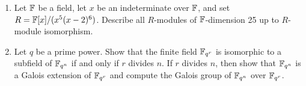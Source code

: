 \begin{enumerate}
\vspace{0.2in}

\item Let $ {\Bbb F} $ be a field, let $x$ be an indeterminate over ${\Bbb F}$,
and set $ R={\Bbb F}[x]/(x^5(x-2)^6) $. Describe all
 $ R $-modules of ${\Bbb F}$-dimension 25 up to $ R $-module
isomorphism.  

\vspace{0.2in}

\item Let $q$ be a prime power. Show that the finite field $ {\Bbb F}_{q^r}$
is isomorphic to a subfield of $ {\Bbb F}_{q^n}$ if and only if $ r$ divides $n$.
If $ r $ divides $n$, then show that $ {\Bbb F}_{q^n}$ is a Galois extension of
${\Bbb F}_{q^r}$ and compute the Galois group of ${\Bbb F}_{q^n} $ over ${\Bbb F}_{q^r}$.
  \end{enumerate}






